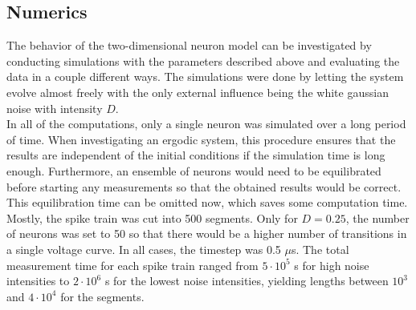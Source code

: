 \documentclass[12pt,a4paper]{article}
\begin{document}
\subsection{Numerics}
The behavior of the two-dimensional neuron model can be investigated by conducting simulations with the parameters described above and evaluating the data in a couple different ways. The simulations were done by letting the system evolve almost freely with the only external influence being the white gaussian noise with intensity $D$. \\
In all of the computations, only a single neuron was simulated over a long period of time. When investigating an ergodic system, this procedure ensures that the results are independent of the initial conditions if the simulation time is long enough. Furthermore, an ensemble of neurons would need to be equilibrated before starting any measurements so that the obtained results would be correct. This equilibration time can be omitted now, which saves some computation time. \\
Mostly, the spike train was cut into 500 segments. Only for $D=0.25$, the number of neurons was set to 50 so that there would be a higher number of transitions in a single voltage curve. In all cases, the timestep was 0.5 $\mu$s. The total measurement time for each spike train ranged from $5\cdot10^5$ s for high noise intensities to $2\cdot 10^6$ s for the lowest noise intensities, yielding lengths between $10^3$ and $4\cdot10^4$ for the segments.
\end{document}

